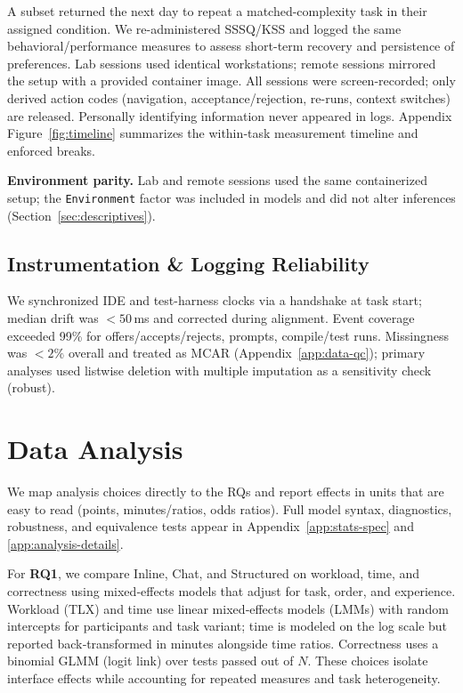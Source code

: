 \documentclass[sigconf]{acmart}
\begin{document}
A subset returned the next day to repeat a matched-complexity task in their assigned condition. We re-administered SSSQ/KSS and logged the same behavioral/performance measures to assess short-term recovery and persistence of preferences. Lab sessions used identical workstations; remote sessions mirrored the setup with a provided container image. All sessions were screen-recorded; only derived action codes (navigation, acceptance/rejection, re-runs, context switches) are released. Personally identifying information never appeared in logs. Appendix Figure~\ref{fig:timeline} summarizes the within‑task measurement timeline and enforced breaks.

\noindent\textbf{Environment parity.}
Lab and remote sessions used the same containerized setup; the \texttt{Environment} factor was included in models and did not alter inferences (Section~\ref{sec:descriptives}).


\subsection{Instrumentation \& Logging Reliability}
\label{sec:logging-reliability}
We synchronized IDE and test-harness clocks via a handshake at task start; median drift was $<\!50$\,ms and corrected during alignment. Event coverage exceeded 99\% for offers/accepts/rejects, prompts, compile/test runs. Missingness was $<\!2\%$ overall and treated as MCAR (Appendix~\ref{app:data-qc}); primary analyses used listwise deletion with multiple imputation as a sensitivity check (robust).

\section{Data Analysis}
\label{sec:analysis}

We map analysis choices directly to the RQs and report effects in units that are easy to read (points, minutes/ratios, odds ratios). Full model syntax, diagnostics, robustness, and equivalence tests appear in Appendix~\ref{app:stats-spec} and \ref{app:analysis-details}.

For \textbf{RQ1}, we compare Inline, Chat, and Structured on workload, time, and correctness using mixed‑effects models that adjust for task, order, and experience. Workload (TLX) and time use linear mixed‑effects models (LMMs) with random intercepts for participants and task variant; time is modeled on the log scale but reported back‑transformed in minutes alongside time ratios. Correctness uses a binomial GLMM (logit link) over tests passed out of $N$. These choices isolate interface effects while accounting for repeated measures and task heterogeneity.
\end{document}
